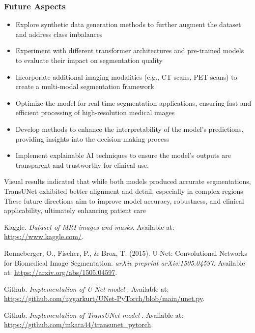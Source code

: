 \documentclass[11pt,a4paper]{article}
\begin{document}
\subsubsection{Future Aspects}
\begin{itemize}
    \item Explore synthetic data generation methods to further augment the dataset and address class imbalances
    \item Experiment with different transformer architectures and pre-trained models to evaluate their impact on segmentation quality
    \item Incorporate additional imaging modalities (e.g., CT scans, PET scans) to create a multi-modal segmentation framework
    \item Optimize the model for real-time segmentation applications, ensuring fast and efficient processing of high-resolution medical images
    \item Develop methods to enhance the interpretability of the model’s predictions, providing insights into the decision-making process
    \item Implement explainable AI techniques to ensure the model’s outputs are transparent and trustworthy for clinical use.
\end{itemize}
\vspace{0.4cm}
Visual results indicated that while both models produced accurate segmentations, TransUNet exhibited better alignment and detail, especially in complex regions
\vspace{0.3cm}
\linebreak
These future directions aim to improve model accuracy, robustness, and clinical applicability, ultimately enhancing patient care


\pagebreak
\begin{thebibliography}{9}
    \vspace{0.9cm}

        Kaggle. \textit{Dataset of MRI images and masks}. Available at: \url{https://www.kaggle.com/}.
    
        Ronneberger, O., Fischer, P., \& Brox, T. (2015). U-Net: Convolutional Networks for Biomedical Image Segmentation. \textit{arXiv preprint arXiv:1505.04597}. Available at: \url{https://arxiv.org/abs/1505.04597}.
    
    Github. \textit{Implementation of U-Net model }. Available at: \url{https://github.com/uygarkurt/UNet-PyTorch/blob/main/unet.py}.
    
    Github. \textit{Implementation of TransUNet model }. Available at: \url{https://github.com/mkara44/transunet_pytorch}.
    
    \end{thebibliography}
    
\end{document}
